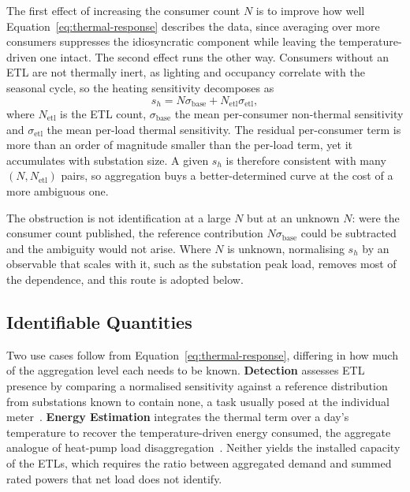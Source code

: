 \documentclass[9pt,journal,a4]{IEEEtran}
\begin{document}
The first effect of increasing the consumer count $N$ is to improve how well Equation~\eqref{eq:thermal-response} describes the data, since averaging over more consumers suppresses the idiosyncratic component while leaving the temperature-driven one intact. The second effect runs the other way. Consumers without an ETL are not thermally inert, as lighting and occupancy correlate with the seasonal cycle, so the heating sensitivity decomposes as
\begin{equation}
s_h = N \sigma_{\mathrm{base}} + N_{\mathrm{etl}} \sigma_{\mathrm{etl}},
\label{eq:sensitivity-decomposition}
\end{equation}
where $N_{\mathrm{etl}}$ is the ETL count, $\sigma_{\mathrm{base}}$ the mean per-consumer non-thermal sensitivity and $\sigma_{\mathrm{etl}}$ the mean per-load thermal sensitivity. The residual per-consumer term is more than an order of magnitude smaller than the per-load term, yet it accumulates with substation size. A given $s_h$ is therefore consistent with many $(N, N_{\mathrm{etl}})$ pairs, so aggregation buys a better-determined curve at the cost of a more ambiguous one.

The obstruction is not identification at a large $N$ but at an unknown $N$: were the consumer count published, the reference contribution $N \sigma_{\mathrm{base}}$ could be subtracted and the ambiguity would not arise. Where $N$ is unknown, normalising $s_h$ by an observable that scales with it, such as the substation peak load, removes most of the dependence, and this route is adopted below.

\subsection{Identifiable Quantities}

Two use cases follow from Equation~\eqref{eq:thermal-response}, differing in how much of the aggregation level each needs to be known. \textbf{Detection} assesses ETL presence by comparing a normalised sensitivity against a reference distribution from substations known to contain none, a task usually posed at the individual meter~\cite{Fei13, Wei20b}. \textbf{Energy Estimation} integrates the thermal term over a day's temperature to recover the temperature-driven energy consumed, the aggregate analogue of heat-pump load disaggregation~\cite{Bru23}. Neither yields the installed capacity of the ETLs, which requires the ratio between aggregated demand and summed rated powers that net load does not identify.
\end{document}
